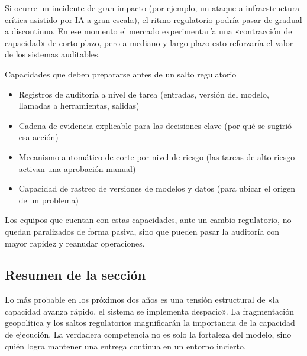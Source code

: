 Si ocurre un incidente de gran impacto (por ejemplo, un ataque a infraestructura crítica asistido por IA a gran escala), el ritmo regulatorio podría pasar de gradual a discontinuo. En ese momento el mercado experimentaría una «contracción de capacidad» de corto plazo, pero a mediano y largo plazo esto reforzaría el valor de los sistemas auditables.

\begin{importantbox}{Capacidades que deben prepararse antes de un salto regulatorio}
\begin{itemize}
    \item Registros de auditoría a nivel de tarea (entradas, versión del modelo, llamadas a herramientas, salidas)
    \item Cadena de evidencia explicable para las decisiones clave (por qué se sugirió esa acción)
    \item Mecanismo automático de corte por nivel de riesgo (las tareas de alto riesgo activan una aprobación manual)
    \item Capacidad de rastreo de versiones de modelos y datos (para ubicar el origen de un problema)
\end{itemize}

Los equipos que cuentan con estas capacidades, ante un cambio regulatorio, no quedan paralizados de forma pasiva, sino que pueden pasar la auditoría con mayor rapidez y reanudar operaciones.
\end{importantbox}

\subsection{Resumen de la sección}

Lo más probable en los próximos dos años es una tensión estructural de «la capacidad avanza rápido, el sistema se implementa despacio». La fragmentación geopolítica y los saltos regulatorios magnificarán la importancia de la capacidad de ejecución. La verdadera competencia no es solo la fortaleza del modelo, sino quién logra mantener una entrega continua en un entorno incierto.
